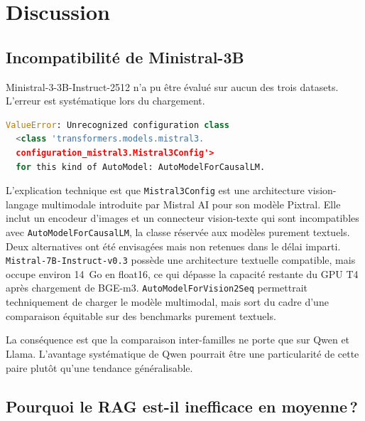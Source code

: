 \documentclass[12pt,a4paper]{article}
\begin{document}
\section{Discussion}
\label{sec:discussion}

\subsection{Incompatibilit\'e de Ministral-3B}
\label{sec:ministral}

Ministral-3-3B-Instruct-2512 n'a pu \^etre \'evalu\'e sur aucun des trois datasets. L'erreur est syst\'ematique lors du chargement.

\begin{lstlisting}[language=Python, caption={Erreur de chargement de Ministral-3B}]
ValueError: Unrecognized configuration class
  <class 'transformers.models.mistral3.
  configuration_mistral3.Mistral3Config'>
  for this kind of AutoModel: AutoModelForCausalLM.
\end{lstlisting}

L'explication technique est que \texttt{Mistral3Config} est une architecture vision-langage multimodale introduite par Mistral AI pour son mod\`ele Pixtral. Elle inclut un encodeur d'images et un connecteur vision-texte qui sont incompatibles avec \texttt{AutoModelForCausalLM}, la classe r\'eserv\'ee aux mod\`eles purement textuels. Deux alternatives ont \'et\'e envisag\'ees mais non retenues dans le d\'elai imparti. \texttt{Mistral-7B-Instruct-v0.3} poss\`ede une architecture textuelle compatible, mais occupe environ 14~Go en float16, ce qui d\'epasse la capacit\'e restante du GPU T4 apr\`es chargement de BGE-m3. \texttt{AutoModelForVision2Seq} permettrait techniquement de charger le mod\`ele multimodal, mais sort du cadre d'une comparaison \'equitable sur des benchmarks purement textuels.

La cons\'equence est que la comparaison inter-familles ne porte que sur Qwen et Llama. L'avantage syst\'ematique de Qwen pourrait \^etre une particularit\'e de cette paire plut\^ot qu'une tendance g\'en\'eralisable.

\subsection{Pourquoi le RAG est-il inefficace en moyenne\,?}
\end{document}
